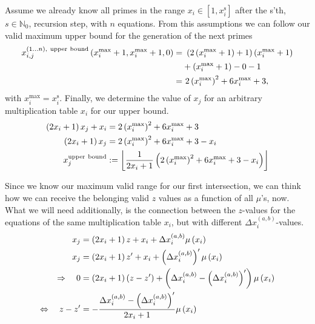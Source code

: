 \begin{enumerate}
	Assume we already know all primes in the range $x_{i} \in [1,x_{i}^{\mathrm{s}}]$ after the s'th, $s \in \mathbb{N}_{0}$, recursion step, with $n$ equations. From this assumptions we can follow our valid maximum upper bound for the generation of the next primes
	\begin{alignat}{3}
		x_{i,j}^{\left(1 \dots n\right), \ \mathrm{upper \ bound}}\left(x_{i}^{\mathrm{max}}+1,x_{i}^{\mathrm{max}} + 1,0\right) =& \ \left(2\left(x_{i}^{\mathrm{max}}+1\right) + 1\right)\left(x_{i}^{\mathrm{max}}+1\right) \notag \\
	&+ \left(x_{i}^{\mathrm{max}}+1\right) - 0 -1 \notag \\
	=& \ 2\left(x_{i}^{\mathrm{max}}\right)^{2} + 6x_{i}^{\mathrm{max}} + 3, \label{eq:upperbound}
	\end{alignat}
	with $x_{i}^{\mathrm{max}} = x_{i}^{\mathrm{s}}$. Finally, we determine the value of $x_{j}$ for an arbitrary multiplication table $x_{i}$ for our upper bound.
	\begin{alignat}{3}
		\left(2x_{i} + 1\right)x_{j} + x_{i} &= 2\left(x_{i}^{\mathrm{max}}\right)^{2} + 6x_{i}^{\mathrm{max}} + 3 \notag \\
		\left(2x_{i} + 1\right)x_{j} &= 2\left(x_{i}^{\mathrm{max}}\right)^{2} + 6x_{i}^{\mathrm{max}} + 3 - x_{i} \notag \\
		x_{j}^{\mathrm{upper \ bound}} &:= \left\lfloor \frac{1}{2x_{i} + 1}\left(2\left(x_{i}^{\mathrm{max}}\right)^{2} + 6x_{i}^{\mathrm{max}} + 3 - x_{i}\right) \right\rfloor \label{eq:xi_upperbound_onthreetable}
	\end{alignat}	

\label{en:intbounds35_dis}
\end{enumerate}

Since we know our maximum valid range for our first intersection, we can think how we can receive the belonging valid $z$ values as a function of all $\mu$'s, now.\\

What we will need additionally, is the connection between the $z$-values for the equations of the same multiplication table $x_{i}$, but with different $\Delta x_{i}^{\left(a,b\right)}$-values.
\begin{alignat}{3}
	x_{j} &= \left(2x_{i} + 1\right)z + x_{i} + \Delta x_{i}^{\left(a,b\right)}\mu\left(x_{i}\right) \notag \\
	x_{j} &= \left(2x_{i} + 1\right)z^{\prime} + x_{i} + \left(\Delta x_{i}^{\left(a,b\right)}\right)^{\prime}\mu\left(x_{i}\right) \notag \\ 
	\Rightarrow \quad 0 &= \left(2x_{i} + 1\right)\left(z - z^{\prime}\right) + \left(\Delta x_{i}^{\left(a,b\right)} - \left(\Delta x_{i}^{\left(a,b\right)}\right)^{\prime}\right)\mu\left(x_{i}\right) \notag \\
	\Leftrightarrow \quad z - z^{\prime} &= - \frac{\Delta x_{i}^{\left(a,b\right)} - \left(\Delta x_{i}^{\left(a,b\right)}\right)^{\prime}}{2x_{i} + 1} \mu\left(x_{i}\right) \label{eq:differentDeltaxforsamexi}
\end{alignat}



